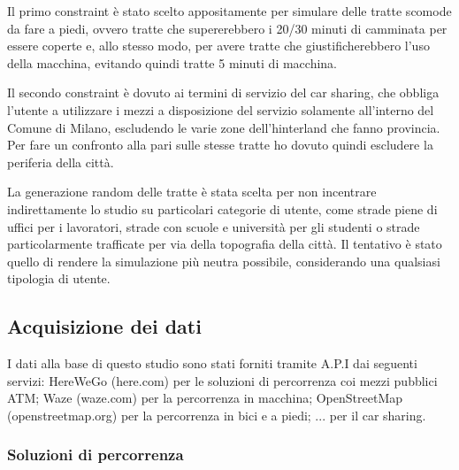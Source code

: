 Il primo constraint è stato scelto appositamente per simulare delle tratte scomode da fare a piedi, ovvero tratte che supererebbero i 20/30 minuti di camminata per essere coperte e, allo stesso modo, per avere tratte che giustificherebbero l'uso della macchina, evitando quindi tratte 5 minuti di macchina.

Il secondo constraint è dovuto ai termini di servizio del car sharing, che obbliga l'utente a utilizzare i mezzi a disposizione del servizio solamente all'interno del Comune di Milano, escludendo le varie zone dell'hinterland che fanno provincia. Per fare un confronto alla pari sulle stesse tratte ho dovuto quindi escludere la periferia della città.

La generazione random delle tratte è stata scelta per non incentrare indirettamente lo studio su particolari categorie di utente, come strade piene di uffici per i lavoratori, strade con scuole e università per gli studenti o strade particolarmente trafficate per via della topografia della città. Il tentativo è stato quello di rendere la simulazione più neutra possibile, considerando una qualsiasi tipologia di utente.


\subsection{Acquisizione dei dati}

I dati alla base di questo studio sono stati forniti tramite A.P.I dai seguenti servizi: HereWeGo (here.com) per le soluzioni di percorrenza coi mezzi pubblici ATM; Waze (waze.com) per la percorrenza in macchina; OpenStreetMap (openstreetmap.org) per la percorrenza in bici e a piedi; ... per il car sharing.

\subsubsection{Soluzioni di percorrenza}

